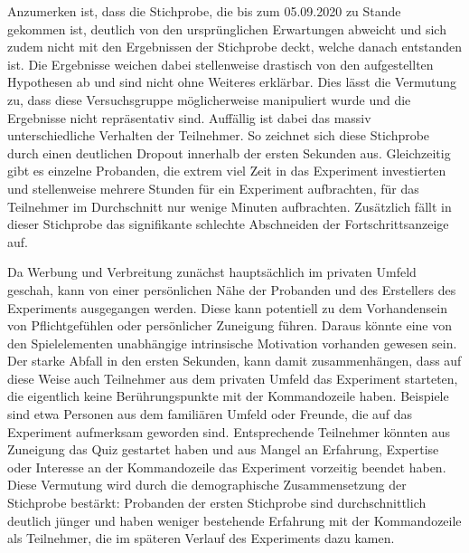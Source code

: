 Anzumerken ist, dass die Stichprobe, die bis zum 05.09.2020 zu Stande gekommen ist, deutlich von den ursprünglichen Erwartungen abweicht und sich zudem nicht mit den Ergebnissen der Stichprobe deckt, welche danach entstanden ist. Die Ergebnisse weichen dabei stellenweise drastisch von den aufgestellten Hypothesen ab und sind nicht ohne Weiteres erklärbar. Dies lässt die Vermutung zu, dass diese Versuchsgruppe möglicherweise manipuliert wurde und die Ergebnisse nicht repräsentativ sind. Auffällig ist dabei das massiv unterschiedliche Verhalten der Teilnehmer. So zeichnet sich diese Stichprobe durch einen deutlichen Dropout innerhalb der ersten Sekunden aus. Gleichzeitig gibt es einzelne Probanden, die extrem viel Zeit in das Experiment investierten und stellenweise mehrere Stunden für ein Experiment aufbrachten, für das Teilnehmer im Durchschnitt nur wenige Minuten aufbrachten. Zusätzlich fällt in dieser Stichprobe das signifikante schlechte Abschneiden der Fortschrittsanzeige auf.

Da Werbung und Verbreitung zunächst hauptsächlich im privaten Umfeld geschah, kann von einer persönlichen Nähe der Probanden und des Erstellers des Experiments ausgegangen werden. Diese kann potentiell zu dem Vorhandensein von Pflichtgefühlen oder persönlicher Zuneigung führen. Daraus könnte eine von den Spielelementen unabhängige intrinsische Motivation vorhanden gewesen sein. Der starke Abfall in den ersten Sekunden, kann damit zusammenhängen, dass auf diese Weise auch Teilnehmer aus dem privaten Umfeld das Experiment starteten, die eigentlich keine Berührungspunkte mit der Kommandozeile haben. Beispiele sind etwa Personen aus dem familiären Umfeld oder Freunde, die auf das Experiment aufmerksam geworden sind. Entsprechende Teilnehmer könnten aus Zuneigung das Quiz gestartet haben und aus Mangel an Erfahrung, Expertise oder Interesse an der Kommandozeile das Experiment vorzeitig beendet haben. Diese Vermutung wird durch die demographische Zusammensetzung der Stichprobe bestärkt: Probanden der ersten Stichprobe sind durchschnittlich deutlich jünger und haben weniger bestehende Erfahrung mit der Kommandozeile als Teilnehmer, die im späteren Verlauf des Experiments dazu kamen.

